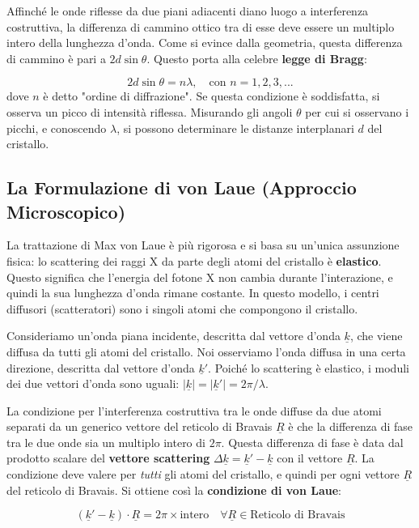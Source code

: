  
Affinché le onde riflesse da due piani adiacenti diano luogo a interferenza costruttiva, la differenza di cammino ottico tra di esse deve essere un multiplo intero della lunghezza d'onda. Come si evince dalla geometria, questa differenza di cammino è pari a $2d\sin\theta$. Questo porta alla celebre \textbf{legge di Bragg}:

\begin{equation}
    2d\sin\theta = n\lambda, \quad \text{con } n = 1, 2, 3, ...
\end{equation}
dove $n$ è detto "ordine di diffrazione". Se questa condizione è soddisfatta, si osserva un picco di intensità riflessa. Misurando gli angoli $\theta$ per cui si osservano i picchi, e conoscendo $\lambda$, si possono determinare le distanze interplanari $d$ del cristallo.

\subsection{La Formulazione di von Laue (Approccio Microscopico)}
La trattazione di Max von Laue è più rigorosa e si basa su un'unica assunzione fisica: lo scattering dei raggi X da parte degli atomi del cristallo è \textbf{elastico}. Questo significa che l'energia del fotone X non cambia durante l'interazione, e quindi la sua lunghezza d'onda rimane costante. In questo modello, i centri diffusori (scatteratori) sono i singoli atomi che compongono il cristallo.

Consideriamo un'onda piana incidente, descritta dal vettore d'onda $\underline{k}$, che viene diffusa da tutti gli atomi del cristallo. Noi osserviamo l'onda diffusa in una certa direzione, descritta dal vettore d'onda $\underline{k}'$. Poiché lo scattering è elastico, i moduli dei due vettori d'onda sono uguali: $|\underline{k}| = |\underline{k}'| = 2\pi/\lambda$.

La condizione per l'interferenza costruttiva tra le onde diffuse da due atomi separati da un generico vettore del reticolo di Bravais $\underline{R}$ è che la differenza di fase tra le due onde sia un multiplo intero di $2\pi$. Questa differenza di fase è data dal prodotto scalare del \textbf{vettore scattering} $\Delta\underline{k} = \underline{k}' - \underline{k}$ con il vettore $\underline{R}$.
La condizione deve valere per \textit{tutti} gli atomi del cristallo, e quindi per ogni vettore $\underline{R}$ del reticolo di Bravais. Si ottiene così la \textbf{condizione di von Laue}:

\begin{equation}
    (\underline{k}' - \underline{k}) \cdot \underline{R} = 2\pi \times \text{intero} \quad \forall \underline{R} \in \text{Reticolo di Bravais}
\end{equation}

